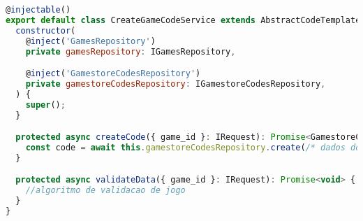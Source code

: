 \begin{lstlisting}[language=JavaScript, caption={Cadastro de Códigos para Jogos},captionpos=b, label=alg:gamecodeservice]
@injectable()
export default class CreateGameCodeService extends AbstractCodeTemplate {
  constructor(
    @inject('GamesRepository')
    private gamesRepository: IGamesRepository,

    @inject('GamestoreCodesRepository')
    private gamestoreCodesRepository: IGamestoreCodesRepository,
  ) {
    super();
  }

  protected async createCode({ game_id }: IRequest): Promise<GamestoreCode> {
    const code = await this.gamestoreCodesRepository.create(/* dados do jogo */)
  }

  protected async validateData({ game_id }: IRequest): Promise<void> {
    //algoritmo de validacao de jogo
  }
}
\end{lstlisting}